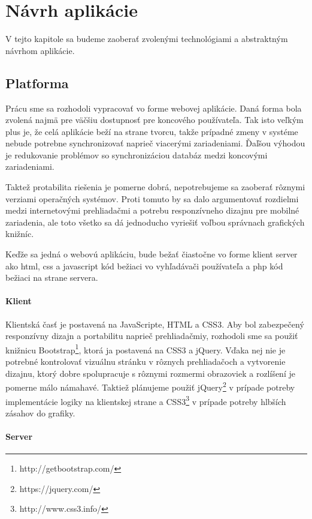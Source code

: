 \newpage

\section{Návrh aplikácie}

V tejto kapitole sa budeme zaoberať zvolenými technológiami a abstraktným návrhom 
aplikácie.

\subsection{Platforma}

Prácu sme sa rozhodoli vypracovať vo forme webovej aplikácie.
Daná forma bola zvolená najmä pre väčšiu dostupnosť pre koncového používateľa.
Tak isto veľkým plus je, že celá aplikácie beží na strane tvorcu, takže prípadné zmeny 
v systéme nebude potrebne synchronizovať naprieč viacerými zariadeniami. 
Ďaľšou výhodou je redukovanie problémov so synchronizáciou databáz medzi koncovými
zariadeniami.

Taktež protabilita riešenia je pomerne dobrá, nepotrebujeme sa zaoberať rôznymi verziami
operačných systémov. Proti tomuto by sa dalo argumentovať rozdielmi medzi 
internetovými prehliadačmi a potrebu responzívneho dizajnu pre mobilné zariadenia,
ale toto všetko sa dá jednoducho vyriešiť voľbou správnach grafických knižníc.

Keďže sa jedná o webovú aplikáciu, bude bežať čiastočne vo forme klient server ako 
html, css a javascript kód bežiaci vo vyhľadávači používateľa a php kód bežiaci na strane servera.

\paragraph{Klient}

Klientská časť je postavená na JavaScripte, HTML a CSS3. Aby bol zabezpečený responzívny 
dizajn a portabilitu naprieč prehliadačmiy, rozhodoli sme sa použiť knižnicu
Bootstrap\footnote{http://getbootstrap.com/},
ktorá ja postavená na CSS3 a jQuery. Vďaka nej nie je potrebné kontrolovať vizuálnu stránku v 
rôznych prehliadačoch a vytvorenie dizajnu, ktorý dobre spolupracuje s rôznymi rozmermi
obrazoviek a rozlíšení je pomerne málo námahavé. Taktiež plánujeme použiť 
jQuery\footnote{https://jquery.com/} v prípade potreby implementácie logiky na klientskej strane
a CSS3\footnote{http://www.css3.info/} v prípade potreby hlbších zásahov do grafiky.

\paragraph{Server}

